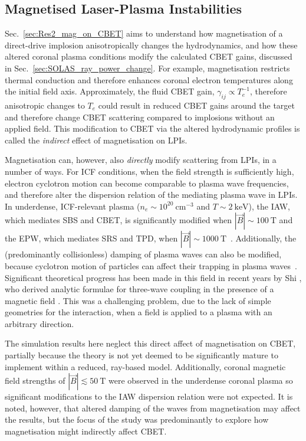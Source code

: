 \subsection{Magnetised Laser-Plasma Instabilities}%
\label{sec:Res2_maglpis}

Sec.~\ref{sec:Res2_mag_on_CBET} aims to understand how magnetisation of a direct-drive implosion anisotropically changes the hydrodynamics, and how these altered coronal plasma conditions modify the calculated \ac{CBET} gains, discussed in Sec.~\ref{sec:SOLAS_ray_power_change}.
For example, magnetisation restricts thermal conduction and therefore enhances coronal electron temperatures along the initial field axis.
Approximately, the fluid \ac{CBET} gain, $\gamma_{ij}\propto T_e^{-1}$, therefore anisotropic changes to $T_e$ could result in reduced \ac{CBET} gains around the target and therefore change \ac{CBET} scattering compared to implosions without an applied field.
This modification to \ac{CBET} via the altered hydrodynamic profiles is called the \textit{indirect} effect of magnetisation on \ac{LPIs}.

Magnetisation can, however, also \textit{directly} modify scattering from \ac{LPIs}, in a number of ways.
For \ac{ICF} conditions, when the field strength is sufficiently high, electron cyclotron motion can become comparable to plasma wave frequencies, and therefore alter the dispersion relation of the mediating plasma wave in \ac{LPIs}.
In underdense, \ac{ICF}-relevant plasma ($n_e \sim 10^{20}\ \text{cm}^{-3}$ and $T\sim2\ \text{keV}$), the \ac{IAW}, which mediates \ac{SBS} and \ac{CBET}, is significantly modified when $|\vec{B}|\sim100\ \text{T}$ and the \ac{EPW}, which mediates \ac{SRS} and \ac{TPD}, when $|\vec{B}|\sim1000\ \text{T}$~\cite{shi_benchmarking_2023}.
Additionally, the (predominantly collisionless) damping of plasma waves can also be modified, because cyclotron motion of particles can affect their trapping in plasma waves~\cite{shi_benchmarking_2023}.
Significant theoretical progress has been made in this field in recent years by Shi , who derived analytic formulae for three-wave coupling in the presence of a magnetic field \cite{shi_threewave_2017,shi_laserplasma_2018}.
This was a challenging problem, due to the lack of simple geometries for the interaction, when a field is applied to a plasma with an arbitrary direction.

The simulation results here neglect this direct affect of magnetisation on \ac{CBET}, partially because the theory is not yet deemed to be significantly mature to implement within a reduced, ray-based model.
Additionally, coronal magnetic field strengths of $|\vec{B}|\lesssim50\ \text{T}$ were observed in the underdense coronal plasma so significant modifications to the \ac{IAW} dispersion relation were not expected.
It is noted, however, that altered damping of the waves from magnetisation may affect the results, but the focus of the study was predominantly to explore how magnetisation might indirectly affect \ac{CBET}.

